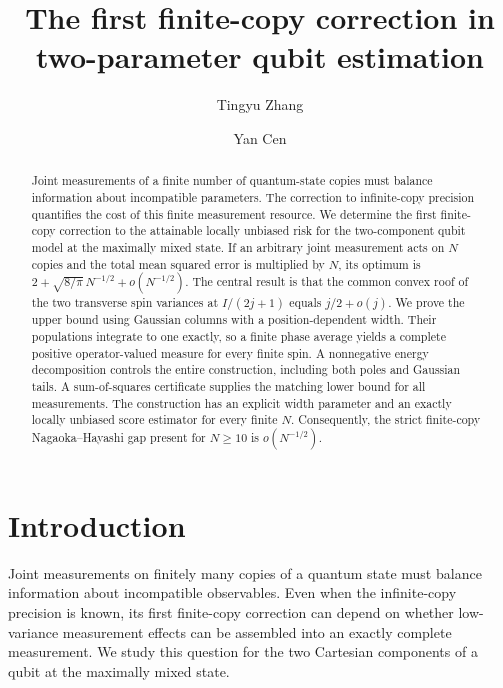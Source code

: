 \documentclass[aps,pra,reprint,superscriptaddress]{revtex4-2}
\theoremstyle{remark}
\begin{document}
\title{The first finite-copy correction in two-parameter qubit estimation}
\author{Tingyu Zhang}
\author{Yan Cen}
\date[]{}
\begin{abstract}
Joint measurements of a finite number of quantum-state copies must balance
information about incompatible parameters. The correction to infinite-copy
precision quantifies the cost of this finite measurement resource.
We determine the first finite-copy correction to the attainable locally
unbiased risk for the two-component qubit model at the maximally mixed
state. If an arbitrary joint measurement acts on $N$ copies and the total
mean squared error is multiplied by $N$, its optimum is
$2+\sqrt{8/\pi}\,N^{-1/2}+o(N^{-1/2})$.
The central result is that the common convex roof of the two transverse
spin variances at $I/(2j+1)$ equals $j/2+o(j)$.
We prove the upper bound using Gaussian columns with a position-dependent
width. Their populations integrate to one exactly, so a finite phase
average yields a complete positive operator-valued measure for every
finite spin. A nonnegative energy decomposition controls the entire
construction, including both poles and Gaussian tails. A sum-of-squares
certificate supplies the matching lower bound for all measurements.
The construction has an explicit width parameter and an exactly locally
unbiased score estimator for every finite $N$.
Consequently, the strict finite-copy Nagaoka--Hayashi gap present for
$N\geq10$ is $o(N^{-1/2})$.

\end{abstract}
\maketitle

\section{Introduction}\label{sec:introduction}

Joint measurements on finitely many copies of a quantum state must
balance information about incompatible observables. Even when the
infinite-copy precision is known, its first finite-copy correction
can depend on whether low-variance measurement effects can be
assembled into an exactly complete measurement. We study this
question for the two Cartesian components of a qubit at the
maximally mixed state.
\end{document}
